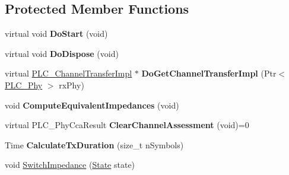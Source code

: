 \subsection*{\-Protected \-Member \-Functions}
\begin{DoxyCompactItemize}
\item 
\hypertarget{classns3_1_1PLC__HalfDuplexOfdmPhy_a4ccdaa92b8f91a0530da9bba78d4f4ee}{virtual void {\bfseries \-Do\-Start} (void)}\label{classns3_1_1PLC__HalfDuplexOfdmPhy_a4ccdaa92b8f91a0530da9bba78d4f4ee}

\item 
\hypertarget{classns3_1_1PLC__HalfDuplexOfdmPhy_a4426554b2fc88ca89ebe521b1229dd01}{virtual void {\bfseries \-Do\-Dispose} (void)}\label{classns3_1_1PLC__HalfDuplexOfdmPhy_a4426554b2fc88ca89ebe521b1229dd01}

\item 
\hypertarget{classns3_1_1PLC__HalfDuplexOfdmPhy_a45fe71a9301d4e0824729664f7cf69f0}{virtual \hyperlink{classns3_1_1PLC__ChannelTransferImpl}{\-P\-L\-C\-\_\-\-Channel\-Transfer\-Impl} $\ast$ {\bfseries \-Do\-Get\-Channel\-Transfer\-Impl} (\-Ptr$<$ \hyperlink{classns3_1_1PLC__Phy}{\-P\-L\-C\-\_\-\-Phy} $>$ rx\-Phy)}\label{classns3_1_1PLC__HalfDuplexOfdmPhy_a45fe71a9301d4e0824729664f7cf69f0}

\item 
\hypertarget{classns3_1_1PLC__HalfDuplexOfdmPhy_a90f00571701cf79b3c3ee3d61d48b4cb}{void {\bfseries \-Compute\-Equivalent\-Impedances} (void)}\label{classns3_1_1PLC__HalfDuplexOfdmPhy_a90f00571701cf79b3c3ee3d61d48b4cb}

\item 
\hypertarget{classns3_1_1PLC__HalfDuplexOfdmPhy_a544c0c9fba81da60a7fc3974e72d2f2c}{virtual \-P\-L\-C\-\_\-\-Phy\-Cca\-Result {\bfseries \-Clear\-Channel\-Assessment} (void)=0}\label{classns3_1_1PLC__HalfDuplexOfdmPhy_a544c0c9fba81da60a7fc3974e72d2f2c}

\item 
\hypertarget{classns3_1_1PLC__HalfDuplexOfdmPhy_a16d8bb82f9d9261e1de673cf88649512}{\-Time {\bfseries \-Calculate\-Tx\-Duration} (size\-\_\-t n\-Symbols)}\label{classns3_1_1PLC__HalfDuplexOfdmPhy_a16d8bb82f9d9261e1de673cf88649512}

\item 
void \hyperlink{classns3_1_1PLC__HalfDuplexOfdmPhy_afff34328dc4f9eb43f856f9219992889}{\-Switch\-Impedance} (\hyperlink{classns3_1_1PLC__HalfDuplexOfdmPhy_ae91e168f9a51bf5344e7e03d9ae13b60}{\-State} state)
\end{DoxyCompactItemize}
